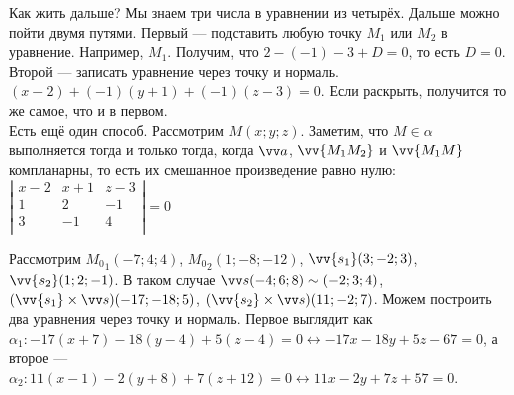 \documentclass{article}
\let\vec\vv
\begin{document}
\begin{itemize}
\begin{Example}
            Как жить дальше? Мы знаем три числа в уравнении из четырёх. Дальше можно пойти двумя путями. Первый --- подставить любую точку $M_1$ или $M_2$ в уравнение. Например, $M_1$. Получим, что $2-(-1)-3+D=0$, то есть $D=0$. Второй --- записать уравнение через точку и нормаль. $(x-2)+(-1)(y+1)+(-1)(z-3)=0$. Если раскрыть, получится то же самое, что и в первом.\\
            Есть ещё один способ. Рассмотрим $M(x;y;z)$. Заметим, что $M\in\alpha$ выполняется тогда и только тогда, когда $\vec a$, $\vec{M_1M_2}$ и $\vec{M_1M}$ компланарны, то есть их смешанное произведение равно нулю: $\left|\begin{matrix}
                x-2 & x+1 & z-3\\
                1 & 2 & -1\\
                3 & -1 & 4\\
            \end{matrix}\right|=0$
        \end{Example}
        \begin{Example}
            Рассмотрим ${M_0}_1(-7;4;4)$, ${M_0}_2(1;-8;-12)$, $\vec{s_1}(3;-2;3)$, $\vec{s_2}(1;2;-1)$. В таком случае $\vec s(-4;6;8)\sim(-2;3;4)$, $(\vec{s_1}\times\vec s)(-17;-18;5)$, $(\vec{s_2}\times\vec s)(11;-2;7)$. Можем построить два уравнения через точку и нормаль. Первое выглядит как $\alpha_1\colon -17(x+7)-18(y-4)+5(z-4)=0\leftrightarrow-17x-18y+5z-67=0$, а второе --- $\alpha_2\colon 11(x-1)-2(y+8)+7(z+12)=0\leftrightarrow11x-2y+7z+57=0$.
        \end{Example}
    \end{itemize}
\end{document}
